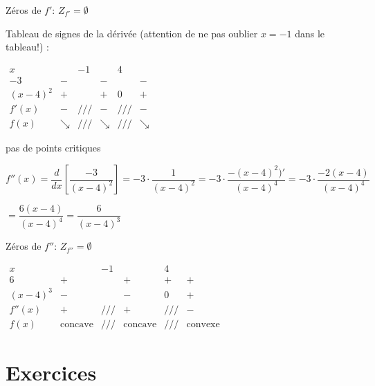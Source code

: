 \documentclass[a4paper,12pt]{article}
\begin{document}
\begin{exemple}
\begin{tasks}
\task  Zéros de $f'$: $Z_{f'} = \emptyset$

\task Tableau de signes de la dérivée (attention de ne pas oublier $x = -1$ dans le tableau!) :
\begin{center}
$
\begin{array}{c|c|c|c|c|c}
x & & -1 & & 4 & \\
\hline
-3 & - & & - & & - \\
\hline
(x-4)^2 & + & & + & 0 & + \\
\hline
f'(x) & - & /// & - & /// & - \\
\hline
f(x) & \searrow & /// & \searrow & /// & \searrow
\end{array}
$
\end{center}
\task pas de points critiques

\task $f''(x) = \dfrac{d}{dx}\left[\dfrac{-3}{(x-4)^2}\right] = -3 \cdot \dfrac{1}{(x-4)^2} = -3 \cdot \dfrac{-(x-4)^2)'}{(x-4)^4} = -3 \cdot \dfrac{-2(x-4)}{(x-4)^4}$

$= \dfrac{6(x-4)}{(x-4)^4} = \dfrac{6}{(x-4)^3}$

Zéros de $f''$: $Z_{f''} = \emptyset$
\begin{center}
$
\begin{array}{c|c|c|c|c|c}
x & & -1 & & 4 & \\
\hline
6 & + & & + & + & + \\
\hline
(x-4)^3 & - & & - & 0 & + \\
\hline
f''(x) & + & /// & + & /// & - \\
\hline
f(x) & \text{concave} & /// & \text{concave} & /// & \text{convexe}
\end{array}
$
\end{center}
\end{tasks}
\end{exemple}

\section{Exercices}


\end{document}
